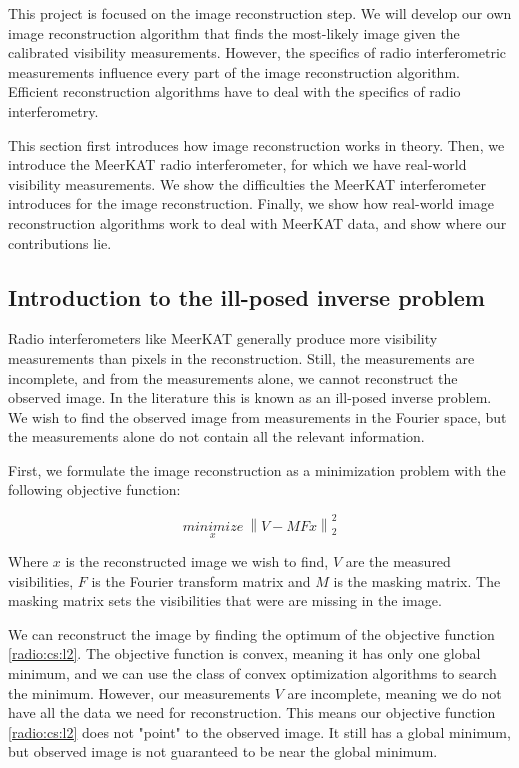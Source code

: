 This project is focused on the image reconstruction step. We will develop our own image reconstruction algorithm that finds the most-likely image given the calibrated visibility measurements. However, the specifics of radio interferometric measurements influence every part of the image reconstruction algorithm. Efficient reconstruction algorithms have to deal with the specifics of radio interferometry. 

This section first introduces how image reconstruction works in theory. Then, we introduce the MeerKAT radio interferometer, for which we have real-world visibility measurements. We show the difficulties the MeerKAT interferometer introduces for the image reconstruction. Finally, we show how real-world image reconstruction algorithms work to deal with MeerKAT data, and show where our contributions lie.


\subsection{Introduction to the ill-posed inverse problem}\label{radio:cs}
Radio interferometers like MeerKAT generally produce more visibility measurements than pixels in the reconstruction. Still, the measurements are incomplete, and from the measurements alone, we cannot reconstruct the observed image. In the literature this is known as an ill-posed inverse problem. We wish to find the observed image from measurements in the Fourier space, but the measurements alone do not contain all the relevant information. 

First, we formulate the image reconstruction as a minimization problem with the following objective function:

\begin{equation}\label{radio:cs:l2}
\underset{x}{minimize} \: \left \| V - MFx \right \|_2^2
\end{equation}

Where $x$ is the reconstructed image we wish to find, $V$ are the measured visibilities, $F$ is the Fourier transform matrix and $M$ is the masking matrix. The masking matrix sets the visibilities that were are missing in the image. 

We can reconstruct the image by finding the optimum of the objective function \eqref{radio:cs:l2}. The objective function is convex, meaning it has only one global minimum, and we can use the class of convex optimization algorithms to search the minimum. However, our measurements $V$ are incomplete, meaning we do not have all the data we need for reconstruction. This means our objective function \eqref{radio:cs:l2} does not "point" to the observed image. It still has a global minimum, but observed image is not guaranteed to be near the global minimum. 

